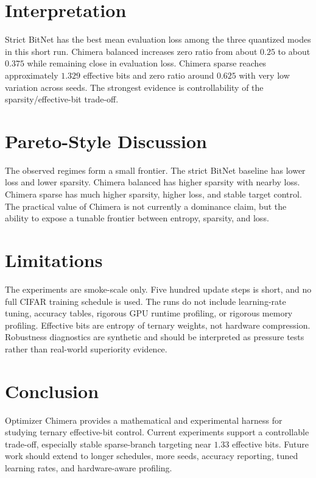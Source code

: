 \documentclass[11pt]{article}
\begin{document}
\section{Interpretation}

Strict BitNet has the best mean evaluation loss among the three quantized modes in this short run. Chimera balanced increases zero ratio from about $0.25$ to about $0.375$ while remaining close in evaluation loss. Chimera sparse reaches approximately $1.329$ effective bits and zero ratio around $0.625$ with very low variation across seeds. The strongest evidence is controllability of the sparsity/effective-bit trade-off.

\section{Pareto-Style Discussion}

The observed regimes form a small frontier. The strict BitNet baseline has lower loss and lower sparsity. Chimera balanced has higher sparsity with nearby loss. Chimera sparse has much higher sparsity, higher loss, and stable target control. The practical value of Chimera is not currently a dominance claim, but the ability to expose a tunable frontier between entropy, sparsity, and loss.

\section{Limitations}

The experiments are smoke-scale only. Five hundred update steps is short, and no full CIFAR training schedule is used. The runs do not include learning-rate tuning, accuracy tables, rigorous GPU runtime profiling, or rigorous memory profiling. Effective bits are entropy of ternary weights, not hardware compression. Robustness diagnostics are synthetic and should be interpreted as pressure tests rather than real-world superiority evidence.

\section{Conclusion}

Optimizer Chimera provides a mathematical and experimental harness for studying ternary effective-bit control. Current experiments support a controllable trade-off, especially stable sparse-branch targeting near $1.33$ effective bits. Future work should extend to longer schedules, more seeds, accuracy reporting, tuned learning rates, and hardware-aware profiling.



\end{document}
